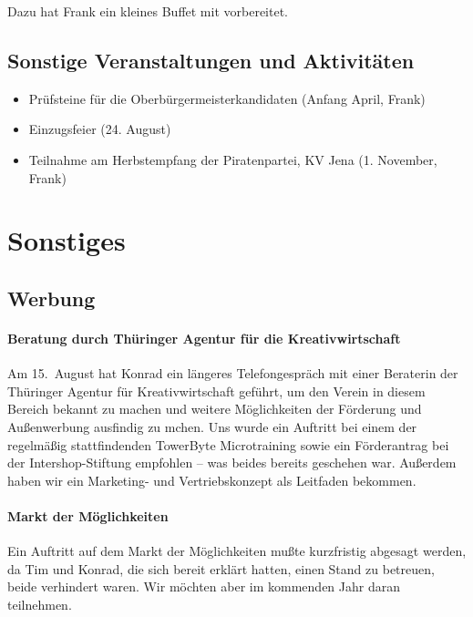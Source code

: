 \documentclass[10pt,DIV16]{scrartcl}
\begin{document}
Dazu hat Frank ein kleines Buffet mit vorbereitet.

\subsection{Sonstige Veranstaltungen und Aktivitäten}

\begin{itemize}
	\item Prüfsteine für die Oberbürgermeisterkandidaten (Anfang April, Frank)
	\item Einzugsfeier (24. August)
	\item Teilnahme am Herbstempfang der Piratenpartei, KV Jena (1. November, Frank)
\end{itemize}


\section{Sonstiges}

\subsection{Werbung}

\paragraph{Beratung durch Thüringer Agentur für die Kreativwirtschaft}

Am 15.~August hat Konrad ein längeres Telefongespräch mit einer 
Beraterin der Thüringer Agentur für Kreativwirtschaft geführt, um 
den Verein in diesem Bereich bekannt zu machen und weitere 
Möglichkeiten der Förderung und Außenwerbung ausfindig zu mchen.  
Uns wurde ein Auftritt bei einem der regelmäßig stattfindenden 
TowerByte Microtraining sowie ein Förderantrag bei der 
Intershop-Stiftung empfohlen -- was beides bereits geschehen war.  
Außerdem haben wir ein Marketing- und Vertriebskonzept als Leitfaden 
bekommen.

\paragraph{Markt der Möglichkeiten}

Ein Auftritt auf dem Markt der Möglichkeiten mußte kurzfristig abgesagt
werden, da Tim und Konrad, die sich bereit erklärt hatten, einen Stand zu
betreuen, beide verhindert waren.  Wir möchten aber im kommenden Jahr daran
teilnehmen.
\end{document}
